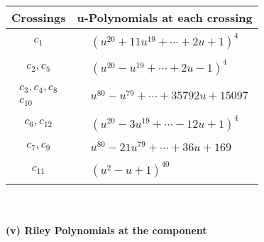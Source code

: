 \documentclass[1p]{elsarticle_modified}
\theoremstyle{definition}
\begin{document}
\begin{tabular}{m{50pt}|m{274pt}}
Crossings & \hspace{64pt}u-Polynomials at each crossing \\
\hline $$\begin{aligned}c_{1}\end{aligned}$$&$\begin{aligned}
&(u^{20}+11 u^{19}+\cdots+2 u+1)^{4}
\end{aligned}$\\
\hline $$\begin{aligned}c_{2},c_{5}\end{aligned}$$&$\begin{aligned}
&(u^{20}- u^{19}+\cdots+2 u-1)^{4}
\end{aligned}$\\
\hline $$\begin{aligned}c_{3},c_{4},c_{8}\\c_{10}\end{aligned}$$&$\begin{aligned}
&u^{80}- u^{79}+\cdots+35792 u+15097
\end{aligned}$\\
\hline $$\begin{aligned}c_{6},c_{12}\end{aligned}$$&$\begin{aligned}
&(u^{20}-3 u^{19}+\cdots-12 u+1)^{4}
\end{aligned}$\\
\hline $$\begin{aligned}c_{7},c_{9}\end{aligned}$$&$\begin{aligned}
&u^{80}-21 u^{79}+\cdots+36 u+169
\end{aligned}$\\
\hline $$\begin{aligned}c_{11}\end{aligned}$$&$\begin{aligned}
&(u^2- u+1)^{40}
\end{aligned}$\\
\hline
\end{tabular}\\~\\
\newpage\renewcommand{\arraystretch}{1}
\flushleft \textbf{(v) Riley Polynomials at the component}\newline \\
\end{document}
